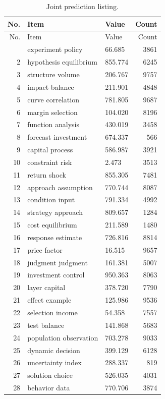 \documentclass[11pt]{report}
\begin{document}
\begin{longtable}{rllr}\caption{Joint prediction listing.}\label{tab:l6}\\\toprule No. & Item & Value & Count \\ \midrule \endfirsthead\toprule No. & Item & Value & Count \\ \midrule \endhead\bottomrule \endfoot
1 & experiment policy & 66.685 & 3861 \\
2 & hypothesis equilibrium & 855.774 & 6245 \\
3 & structure volume & 206.767 & 9757 \\
4 & impact balance & 211.901 & 4848 \\
5 & curve correlation & 781.805 & 9687 \\
6 & margin selection & 104.020 & 8196 \\
7 & function analysis & 430.019 & 3458 \\
8 & forecast investment & 674.337 & 566 \\
9 & capital process & 586.987 & 3921 \\
10 & constraint risk & 2.473 & 3513 \\
11 & return shock & 855.305 & 7481 \\
12 & approach assumption & 770.744 & 8087 \\
13 & condition input & 791.334 & 4992 \\
14 & strategy approach & 809.657 & 1284 \\
15 & cost equilibrium & 211.589 & 1480 \\
16 & response estimate & 726.816 & 8814 \\
17 & price factor & 16.515 & 9657 \\
18 & judgment judgment & 161.381 & 5007 \\
19 & investment control & 950.363 & 8063 \\
20 & layer capital & 378.720 & 7790 \\
21 & effect example & 125.986 & 9536 \\
22 & selection income & 54.358 & 7557 \\
23 & test balance & 141.868 & 5683 \\
24 & population observation & 703.278 & 9033 \\
25 & dynamic decision & 399.129 & 6128 \\
26 & uncertainty index & 288.337 & 819 \\
27 & solution choice & 526.035 & 4031 \\
28 & behavior data & 770.706 & 3874 \\

\end{longtable}
\end{document}
